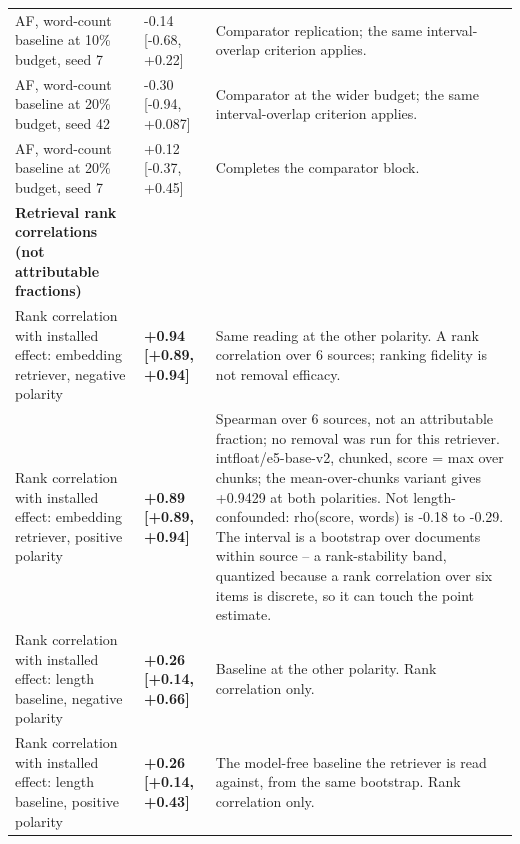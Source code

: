 \documentclass[10pt]{article}
\begin{document}
{\begin{longtable}{ p{3.52cm}lp{8.16cm} }
AF, word-count baseline at 10\% budget, seed 7 & -0.14 [-0.68, +0.22] & Comparator replication; the same interval-overlap criterion applies. \\

AF, word-count baseline at 20\% budget, seed 42 & -0.30 [-0.94, +0.087] & Comparator at the wider budget; the same interval-overlap criterion applies. \\

AF, word-count baseline at 20\% budget, seed 7 & +0.12 [-0.37, +0.45] & Completes the comparator block. \\

\textbf{ Retrieval rank correlations (not attributable fractions) } &  &  \\

Rank correlation with installed effect: embedding retriever, negative polarity & \textbf{ +0.94 [+0.89, +0.94] } & Same reading at the other polarity. A rank correlation over 6 sources; ranking fidelity is not removal efficacy. \\

Rank correlation with installed effect: embedding retriever, positive polarity & \textbf{ +0.89 [+0.89, +0.94] } & Spearman over 6 sources, not an attributable fraction; no removal was run for this retriever. intfloat/e5-base-v2, chunked, score = max over chunks; the mean-over-chunks variant gives +0.9429 at both polarities. Not length-confounded: rho(score, words) is -0.18 to -0.29. The interval is a bootstrap over documents within source -- a rank-stability band, quantized because a rank correlation over six items is discrete, so it can touch the point estimate. \\

Rank correlation with installed effect: length baseline, negative polarity & \textbf{ +0.26 [+0.14, +0.66] } & Baseline at the other polarity. Rank correlation only. \\

Rank correlation with installed effect: length baseline, positive polarity & \textbf{ +0.26 [+0.14, +0.43] } & The model-free baseline the retriever is read against, from the same bootstrap. Rank correlation only. \\

\end{longtable}
}
\end{document}
